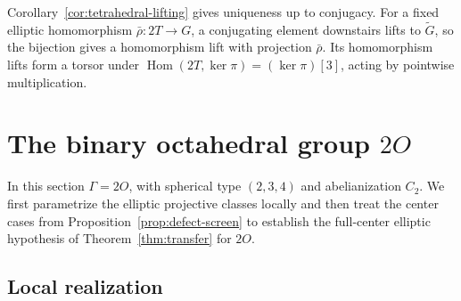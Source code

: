\documentclass[11pt,a4paper,reqno]{amsart}
\theoremstyle{plain}
\theoremstyle{definition}
\theoremstyle{remark}
\numberwithin{equation}{section}
\DeclareMathOperator{\Hom}{Hom}
\begin{document}
Corollary~\ref{cor:tetrahedral-lifting} gives uniqueness up to conjugacy. For a fixed elliptic homomorphism $\bar\rho\colon 2T\to G$, a conjugating element downstairs lifts to $\widetilde G$, so the bijection gives a homomorphism lift with projection $\bar\rho$. Its homomorphism lifts form a torsor under $\Hom(2T,\ker\pi)=(\ker\pi)[3]$, acting by pointwise multiplication.

\section{The binary octahedral group \texorpdfstring{$2O$}{2O}}\label{sec:octahedral}

In this section $\Gamma=2O$, with spherical type $(2,3,4)$ and abelianization $C_2$. We first parametrize the elliptic projective classes locally and then treat the center cases from Proposition~\ref{prop:defect-screen} to establish the full-center elliptic hypothesis of Theorem~\ref{thm:transfer} for $2O$.

\subsection{Local realization}
\end{document}
